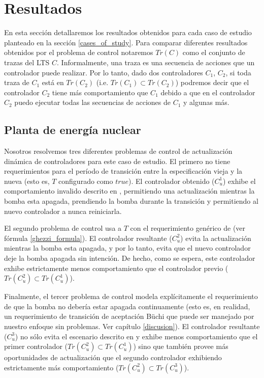 \section{Resultados}

En esta sección detallaremos los resultados obtenidos para cada caso de estudio planteado en la sección
\ref{cases_of_study}. Para comparar diferentes resultados obtenidos por el problema de control notaremos $Tr(C)$ como el
conjunto de trazas del LTS $C$. Informalmente, una traza es una secuencia de acciones que un controlador puede
realizar. Por lo tanto, dado dos controladores $C_1$, $C_2$, si toda traza de $C_1$ está en $Tr(C_2)$ (i.e. $Tr(C_1) \subset
Tr(C_2)$) podremos decir que el controlador $C_2$ tiene más comportamiento que $C_1$ debido a que en el controlador
$C_2$ puedo ejecutar todas las secuencias de acciones de $C_1$ y algunas más.

\subsection{Planta de energía nuclear}

Nosotros resolvemos tres diferentes problemas de control de actualización dinámica de controladores para este caso de
estudio. El primero no tiene requerimientos para el período de transición entre la especificación vieja y la nueva (esto
es, $T$ configurado como $true$). El controlador obtenido ($C^1_u$) exhibe el comportamiento invalido descrito en
\cite{PanzicaLaManna:2013:FCC:2487336.2487349}, permitiendo una actualización mientras la bomba esta apagada, prendiendo
la bomba durante la transición y permitiendo al nuevo controlador a nunca reiniciarla.

El segundo problema de control usa a $T$ con el requerimiento genérico de \cite{6224401} (ver fórmula
\ref{ghezzi_formula}). El controlador resultante ($C^2_u$) evita la actualización mientras la bomba esta apagada, y por
lo
tanto, evita que el nuevo controlador deje la bomba apagada sin intención. De hecho, como se espera, este controlador
exhibe estrictamente menos comportamiento que el controlador previo ($Tr(C^2_u) \subset Tr(C^1_u)$).

Finalmente, el tercer problema de control modela explícitamente el requerimiento de que la bomba no debería estar
apagada continuamente (esto es, en realidad, un requerimiento de transición de aceptación Büchi que puede ser manejado
por nuestro enfoque sin problemas. Ver capítulo \ref{discusion}). El controlador resultante ($C^3_u$) no sólo evita el
escenario descrito en \cite{PanzicaLaManna:2013:FCC:2487336.2487349} y exhibe menos comportamiento que el primer
controlador ($Tr(C^2_u) \subset Tr(C^1_u)$) sino que también provee más oportunidades de actualización que el segundo
controlador exhibiendo estrictamente más comportamiento ($Tr(C^2_u) \subset Tr(C^3_u)$). 

